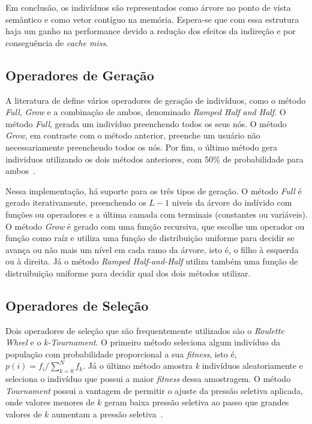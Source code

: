 \documentclass[a4paper]{article}
\begin{document}
Em conclusão, os indivíduos são representados como árvore no ponto de vista
semântico e como vetor contíguo na memória.  Espera-se que com essa estrutura
haja um ganho na performance devido a redução dos efeitos da indireção e por
conseguência de \textit{cache miss}.

\subsection{Operadores de Geração} \label{subsec:generation}

A literatura de define vários operadores de geração de indivíduos, como o método
\textit{Full}, \textit{Grow} e a combinação de ambos, denominado \textit{Ramped
  Half and Half}. O método \textit{Full}, gerada um indivíduo preenchendo todos os
seus nós. O método \textit{Grow}, em contraste com o método anterior, preenche
um usuário não necessariamente preenchendo todos os nós. Por fim, o último método
gera individuos utilizando os dois métodos anteriores, com 50\% de probabilidade
para ambos~\citep{poli2008}.

Nessa implementação, há suporte para os três tipos de geração. O método
\textit{Full} é gerado iterativamente, preenchendo os $L-1$ niveis da árvore do
indívido com funções ou operadores e a última camada com terminais (constantes
ou variáveis).  O método \textit{Grow} é gerado com uma função recursiva, que
escolhe um operador ou função como raíz e utiliza uma função de distribuição
uniforme para decidir se avança ou não mais um nível em cada ramo da árvore,
isto é, o filho à esquerda ou à direita. Já o método \textit{Ramped
  Half-and-Half} utiliza também uma função de distruibuição uniforme para
decidir qual dos dois métodos utilizar.

\subsection{Operadores de Seleção} \label{subsec:selection}

Dois operadores de seleção que são frequentemente utilizados são o
\textit{Roulette Wheel} e o \textit{k-Tournament}. O primeiro método seleciona
algum indivíduo da população com probabilidade proporcional a sua
\textit{fitness}, isto é, $p(i)=f_i/\sum_{k=0}^{N}f_k$. Já o último método
amostra \textit{k} indivíduos aleatoriamente e seleciona o indivíduo que possui
a maior \textit{fitness} dessa amostragem. O método \textit{Tournament} possui
a vantagem de permitir o ajuste da pressão seletiva aplicada, onde valores
menores de $k$ geram baixa pressão seletiva ao passo que grandes valores de $k$
aumentam a pressão seletiva~\citep{Baeck1994}.
\end{document}
